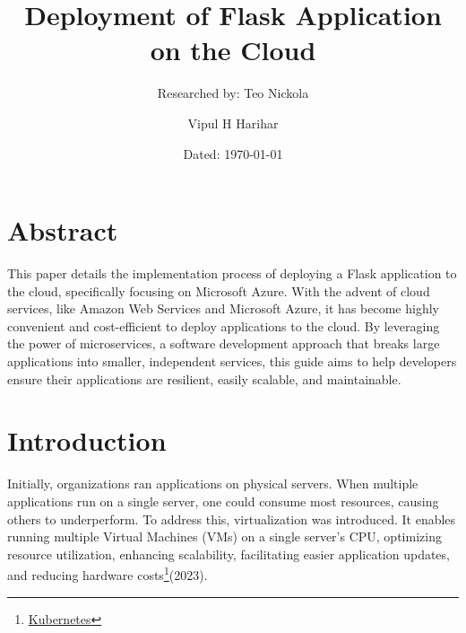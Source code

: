 \documentclass{article}
\title{\textbf{Deployment of Flask Application on the Cloud}} %
\author[1]{Researched by: Teo Nickola}
\author[2]{Vipul H Harihar}
\affil[1]{Full Stack Intern | GenTrust, LLC}
\affil[2]{Lead Software Engineer | GenTrust, LLC}
\date{Dated: \today} %
\begin{document}
\maketitle
\tableofcontents


\section{Abstract} %

\hspace*{5mm}This paper details the implementation process of deploying a Flask application to the cloud, specifically focusing on Microsoft Azure. With the advent of cloud services, like Amazon Web Services and Microsoft Azure, it has become highly convenient and cost-efficient to deploy applications to the cloud. By leveraging the power of microservices, a software development approach that breaks large applications into smaller, independent services, this guide aims to help developers ensure their applications are resilient, easily scalable, and maintainable.


\section{Introduction}
\hspace*{5mm} Initially, organizations ran applications on physical servers. When multiple applications run on a single server, one could consume most resources, causing others to underperform. To address this, virtualization was introduced. It enables running multiple Virtual Machines (VMs) on a single server's CPU, optimizing resource utilization, enhancing scalability, facilitating easier application updates, and reducing hardware costs\footnote{\label{kubernetes}\href{https://kubernetes.io/docs/concepts/overview/}{Kubernetes}}(2023).\\
\end{document}
